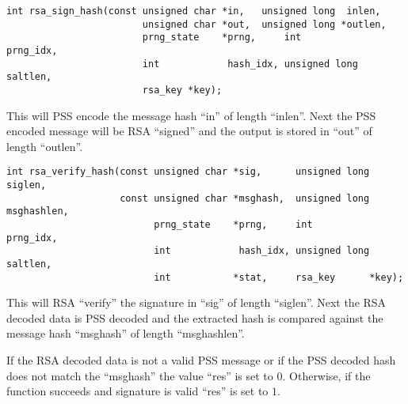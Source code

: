 \documentclass[a4paper]{book}
\begin{document}
\begin{verbatim}
int rsa_sign_hash(const unsigned char *in,   unsigned long  inlen, 
                        unsigned char *out,  unsigned long *outlen, 
                        prng_state    *prng,     int            prng_idx,
                        int            hash_idx, unsigned long  saltlen,
                        rsa_key *key);
\end{verbatim}

This will PSS encode the message hash ``in'' of length ``inlen''.  Next the PSS encoded message will be RSA ``signed'' and 
the output is stored in ``out'' of length ``outlen''.  


\begin{verbatim}
int rsa_verify_hash(const unsigned char *sig,      unsigned long siglen,
                    const unsigned char *msghash,  unsigned long msghashlen,
                          prng_state    *prng,     int           prng_idx,
                          int            hash_idx, unsigned long saltlen,
                          int           *stat,     rsa_key      *key);
\end{verbatim}

This will RSA ``verify'' the signature in ``sig'' of length ``siglen''.  Next the RSA decoded data is PSS decoded
and the extracted hash is compared against the message hash ``msghash'' of length ``msghashlen''.

If the RSA decoded data is not a valid PSS message or if the PSS decoded hash does not match the ``msghash'' 
the value ``res'' is set to $0$.  Otherwise, if the function succeeds and signature is valid ``res'' is set
to $1$.
\end{document}
